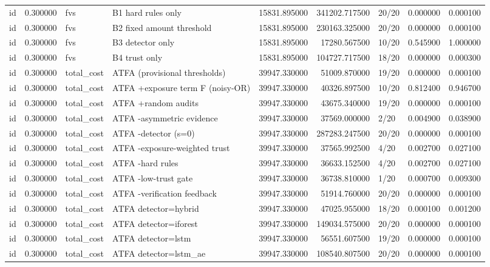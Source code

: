 \begin{tabular}{lrllrrlrr}
id & 0.300000 & fvs & B1 hard rules only & 15831.895000 & 341202.717500 & 20/20 & 0.000000 & 0.000100 \\
id & 0.300000 & fvs & B2 fixed amount threshold & 15831.895000 & 230163.325000 & 20/20 & 0.000000 & 0.000100 \\
id & 0.300000 & fvs & B3 detector only & 15831.895000 & 17280.567500 & 10/20 & 0.545900 & 1.000000 \\
id & 0.300000 & fvs & B4 trust only & 15831.895000 & 104727.717500 & 18/20 & 0.000000 & 0.000300 \\
id & 0.300000 & total\_cost & ATFA (provisional thresholds) & 39947.330000 & 51009.870000 & 19/20 & 0.000000 & 0.000100 \\
id & 0.300000 & total\_cost & ATFA +exposure term F (noisy-OR) & 39947.330000 & 40326.897500 & 10/20 & 0.812400 & 0.946700 \\
id & 0.300000 & total\_cost & ATFA +random audits & 39947.330000 & 43675.340000 & 19/20 & 0.000000 & 0.000100 \\
id & 0.300000 & total\_cost & ATFA -asymmetric evidence & 39947.330000 & 37569.000000 & 2/20 & 0.004900 & 0.038900 \\
id & 0.300000 & total\_cost & ATFA -detector (s=0) & 39947.330000 & 287283.247500 & 20/20 & 0.000000 & 0.000100 \\
id & 0.300000 & total\_cost & ATFA -exposure-weighted trust & 39947.330000 & 37565.992500 & 4/20 & 0.002700 & 0.027100 \\
id & 0.300000 & total\_cost & ATFA -hard rules & 39947.330000 & 36633.152500 & 4/20 & 0.002700 & 0.027100 \\
id & 0.300000 & total\_cost & ATFA -low-trust gate & 39947.330000 & 36738.810000 & 1/20 & 0.000700 & 0.009300 \\
id & 0.300000 & total\_cost & ATFA -verification feedback & 39947.330000 & 51914.760000 & 20/20 & 0.000000 & 0.000100 \\
id & 0.300000 & total\_cost & ATFA detector=hybrid & 39947.330000 & 47025.955000 & 18/20 & 0.000100 & 0.001200 \\
id & 0.300000 & total\_cost & ATFA detector=iforest & 39947.330000 & 149034.575000 & 20/20 & 0.000000 & 0.000100 \\
id & 0.300000 & total\_cost & ATFA detector=lstm & 39947.330000 & 56551.607500 & 19/20 & 0.000000 & 0.000100 \\
id & 0.300000 & total\_cost & ATFA detector=lstm\_ae & 39947.330000 & 108540.807500 & 20/20 & 0.000000 & 0.000100 \\

\end{tabular}
